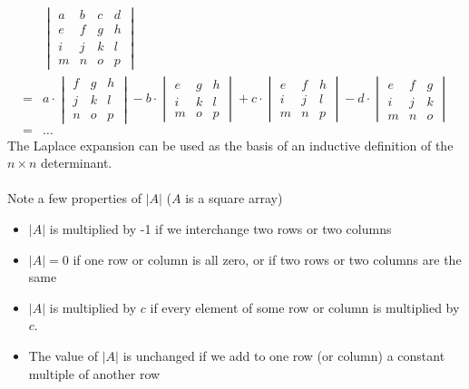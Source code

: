 \documentclass{report}
\begin{document}
\begin{align*}
&\begin{vmatrix}
a & b & c & d\\
e & f & g & h\\
i & j & k & l\\
m & n & o & p
\end{vmatrix}\\
=&a\cdot
\begin{vmatrix}
f & g & h\\
j & k & l\\
n & o & p
\end{vmatrix}
-b\cdot
\begin{vmatrix}
e & g & h\\
i & k & l\\
m & o & p
\end{vmatrix}
+c\cdot
\begin{vmatrix}
e & f & h\\
i & j & l\\
m & n & p
\end{vmatrix}
-d\cdot
\begin{vmatrix}
e & f & g\\
i & j & k\\
m & n & o
\end{vmatrix}\\
=&\ldots
\end{align*}
The Laplace expansion can be used as the basis of an inductive definition of the $n\times n$ determinant.\\
\vspace{1mm}\\
Note a few properties of $|A|$ ($A$ is a square array)
\begin{itemize}
\item $|A|$ is multiplied by -1 if we interchange two rows or two columns
\item $|A|=0$ if one row or column is all zero, or if two rows or two columns are the same
\item $|A|$ is multiplied by $c$ if every element of some row or column is multiplied by $c$.
\item The value of $|A|$ is unchanged if we add to one row (or column) a constant multiple of another row
\end{itemize}

\newpage
\end{document}
